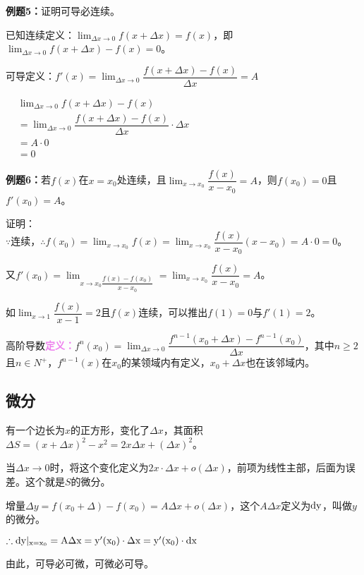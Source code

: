 \documentclass[UTF8, 12pt]{ctexart}
\begin{document}
\textbf{例题5：}证明可导必连续。

已知连续定义：$\lim_{\Delta x\to 0}f(x+\Delta x)=f(x)$，即$\lim_{\Delta x\to 0}f(x+\Delta x)-f(x)=0$。

可导定义：$f'(x)=\lim_{\Delta x\to 0}\dfrac{f(x+\Delta x)-f(x)}{\Delta x} = A$

$
\begin{aligned}
    & \lim_{\Delta x\to 0}f(x+\Delta x)-f(x) \\
    & =\lim_{\Delta x\to 0}\dfrac{f(x+\Delta x)-f(x)}{\Delta x}\cdot\Delta x \\
    & =A\cdot 0 \\
    & =0
\end{aligned}
$

\textbf{例题6：}若$f(x)$在$x=x_0$处连续，且$\lim_{x\to x_0}\dfrac{f(x)}{x-x_0}=A$，则$f(x_0)=0$且$f'(x_0)=A$。

证明：$\because\text{连续，}\therefore f(x_0)=\lim_{x\to x_0}f(x)=\lim_{x\to x_0}\dfrac{f(x)}{x-x_0}(x-x_0)=A\cdot 0=0$。

又$f'(x_0)=\lim_{x\to x_0\dfrac{f(x)-f(x_0)}{x-x_0}}=\lim_{x\to x_0}\dfrac{f(x)}{x-x_0}=A$。

如$\lim_{x\to 1}\dfrac{f(x)}{x-1}=2$且$f(x)$连续，可以推出$f(1)=0$与$f'(1)=2$。

高阶导数\textcolor{violet}{\textbf{定义：}}$f^n(x_0)=\lim_{\Delta x\to 0}\dfrac{f^{n-1}(x_0+\Delta x)-f^{n-1}(x_0)}{\Delta x}$，其中$n\geqslant 2$且$n\in N^+$，$f^{n-1}(x)$在$x_0$的某领域内有定义，$x_0+\Delta x$也在该邻域内。

\subsection{微分}

有一个边长为$x$的正方形，变化了$\Delta x$，其面积$\Delta S=(x+\Delta x)^2-x^2=2x\Delta x+(\Delta x)^2$。

当$\Delta x\to 0$时，将这个变化定义为$2x\cdot\Delta x+o(\Delta x)$，前项为线性主部，后面为误差。这个就是$S$的微分。

增量$\Delta y=f(x_0+\Delta)-f(x_0)=A\Delta x+o(\Delta x)$，这个$A\Delta x$定义为$\rm{d}y$，叫做$y$的微分。

$\therefore \rm{d}y\vert_{x=x_0}=A\Delta x=y'(x_0)\cdot\Delta x=y'(x_0)\cdot\rm{d}x$

由此，可导必可微，可微必可导。
\end{document}
